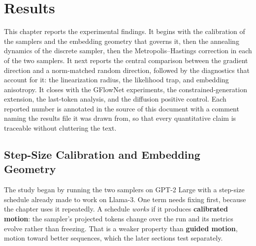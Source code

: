 \chapter{Results}
\label{ch:results}

This chapter reports the experimental findings. It begins with the calibration of the samplers and the embedding geometry that governs it, then the annealing dynamics of the discrete sampler, then the Metropolis--Hastings correction in each of the two samplers. It next reports the central comparison between the gradient direction and a norm-matched random direction, followed by the diagnostics that account for it: the linearization radius, the likelihood trap, and embedding anisotropy. It closes with the GFlowNet experiments, the constrained-generation extension, the last-token analysis, and the diffusion positive control. Each reported number is annotated in the source of this document with a comment naming the results file it was drawn from, so that every quantitative claim is traceable without cluttering the text.

\section{Step-Size Calibration and Embedding Geometry}
\label{sec:results-stepsize}

The study began by running the two samplers on GPT-2 Large with a step-size schedule already made to work on Llama-3. One term needs fixing first, because the chapter uses it repeatedly. A schedule \emph{works} if it produces \textbf{calibrated motion}: the sampler's projected tokens change over the run and its metrics evolve rather than freezing. That is a weaker property than \textbf{guided motion}, motion toward better sequences, which the later sections test separately.

